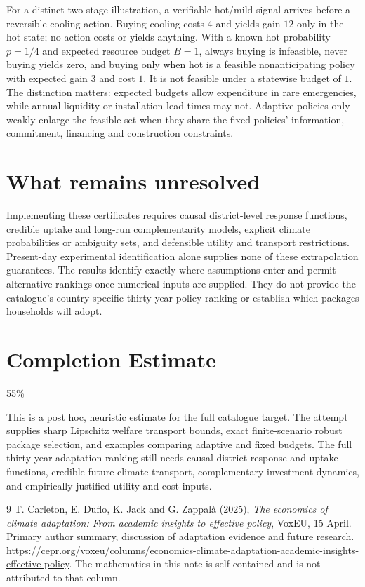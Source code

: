 \documentclass[11pt,a4paper]{article}
\begin{document}
For a distinct two-stage illustration, a verifiable hot/mild signal arrives before a reversible cooling action. Buying cooling costs $4$ and yields gain $12$ only in the hot state; no action costs or yields anything. With a known hot probability $p=1/4$ and expected resource budget $B=1$, always buying is infeasible, never buying yields zero, and buying only when hot is a feasible nonanticipating policy with expected gain $3$ and cost $1$. It is not feasible under a statewise budget of $1$. The distinction matters: expected budgets allow expenditure in rare emergencies, while annual liquidity or installation lead times may not. Adaptive policies only weakly enlarge the feasible set when they share the fixed policies' information, commitment, financing and construction constraints.

\section{What remains unresolved}
Implementing these certificates requires causal district-level response functions, credible uptake and long-run complementarity models, explicit climate probabilities or ambiguity sets, and defensible utility and transport restrictions. Present-day experimental identification alone supplies none of these extrapolation guarantees. The results identify exactly where assumptions enter and permit alternative rankings once numerical inputs are supplied. They do not provide the catalogue's country-specific thirty-year policy ranking or establish which packages households will adopt.

\section{Completion Estimate}
55\%

This is a post hoc, heuristic estimate for the full catalogue target.
The attempt supplies sharp Lipschitz welfare transport bounds, exact finite-scenario robust package selection, and examples comparing adaptive and fixed budgets. The full thirty-year adaptation ranking still needs causal district response and uptake functions, credible future-climate transport, complementary investment dynamics, and empirically justified utility and cost inputs.

\begin{thebibliography}{9}
 T. Carleton, E. Duflo, K. Jack and G. Zappal\`a (2025), \emph{The economics of climate adaptation: From academic insights to effective policy}, VoxEU, 15 April. Primary author summary, discussion of adaptation evidence and future research. \url{https://cepr.org/voxeu/columns/economics-climate-adaptation-academic-insights-effective-policy}. The mathematics in this note is self-contained and is not attributed to that column.
\end{thebibliography}
\end{document}
